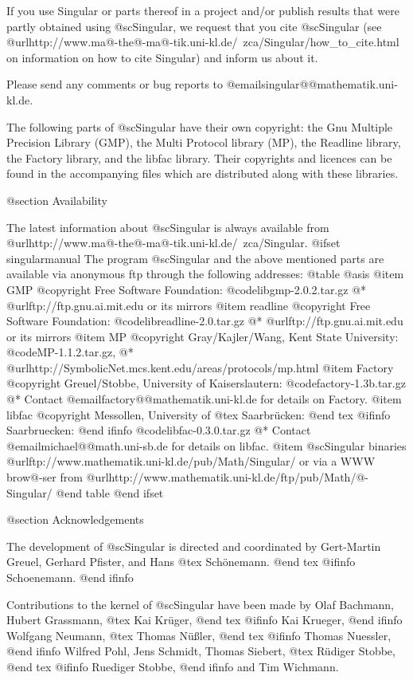 If you use Singular or parts thereof in a project and/or publish
results that were partly obtained using @sc{Singular}, we request that you
cite @sc{Singular} (see
@url{http://www.ma@-the@-ma@-tik.uni-kl.de/~zca/Singular/how_to_cite.html}
on information on how to cite Singular) and inform us about it.

Please send any comments or bug reports to
@email{singular@@mathematik.uni-kl.de}.

The following parts of @sc{Singular} have their own copyright: the Gnu Multiple
Precision Library (GMP), the Multi Protocol library (MP), the Readline library,
the Factory library, and the libfac library.
Their copyrights and licences can be found in the accompanying files
which are distributed along with these libraries.

@section Availability

The latest information about @sc{Singular} is always available from
@url{http://www.ma@-the@-ma@-tik.uni-kl.de/~zca/Singular}.
@ifset singularmanual
The program @sc{Singular} and the above mentioned parts are available via
anonymous ftp through the following addresses:
@table @asis
@item GMP
@copyright{} Free Software Foundation:
@code{libgmp-2.0.2.tar.gz}
@* @url{ftp://ftp.gnu.ai.mit.edu} or its mirrors
@item readline
@copyright{} Free Software Foundation:
@code{libreadline-2.0.tar.gz}
@* @url{ftp://ftp.gnu.ai.mit.edu} or its mirrors
@item MP
@copyright{} Gray/Kajler/Wang, Kent State University:
@code{MP-1.1.2.tar.gz},
@* @url{http://SymbolicNet.mcs.kent.edu/areas/protocols/mp.html}
@item Factory
@copyright{} Greuel/Stobbe, University of Kaiserslautern:
@code{factory-1.3b.tar.gz}
@* Contact @email{factory@@mathematik.uni-kl.de} for details on Factory.
@item libfac
@copyright{}  Messollen, University of
@tex
Saarbr\"ucken:
@end tex
@ifinfo
Saarbruecken:
@end ifinfo
@code{libfac-0.3.0.tar.gz}
@* Contact @email{michael@@math.uni-sb.de} for details on libfac.
@item @sc{Singular} binaries
@url{ftp://www.mathematik.uni-kl.de/pub/Math/Singular/} or via a
WWW brow@-ser from
@url{http://www.mathematik.uni-kl.de/ftp/pub/Math/@-Singular/}
@end table
@end ifset

@section Acknowledgements

The development of @sc{Singular} is directed and coordinated by
Gert-Martin Greuel, Gerhard Pfister, and Hans
@tex
Sch\"onemann.
@end tex
@ifinfo
Schoenemann.
@end ifinfo

Contributions to the kernel of @sc{Singular} have been made by
Olaf Bachmann,
Hubert Grassmann,
@tex
Kai Kr\"uger,
@end tex
@ifinfo
Kai Krueger,
@end ifinfo
Wolfgang Neumann,
@tex
Thomas N\"u{\ss}ler,
@end tex
@ifinfo
Thomas Nuessler,
@end ifinfo
Wilfred Pohl,
Jens Schmidt,
Thomas Siebert,
@tex
R\"udiger Stobbe,
@end tex
@ifinfo
Ruediger Stobbe,
@end ifinfo
and
Tim Wichmann.

